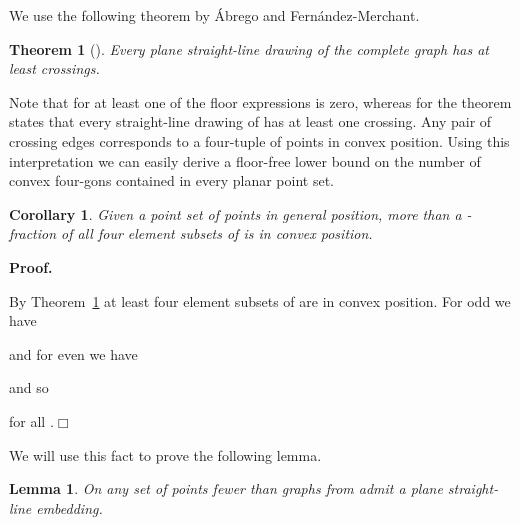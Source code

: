 \documentclass[11pt]{article}
\newtheorem{lemma}[equation]{Lemma}
\newtheorem{corollary}[equation]{Corollary}
\newtheorem{theorem}[equation]{Theorem}
\newcommand{\qed}{\hfill\ensuremath{\Box}}
\newenvironment{proof}{\noindent\textbf{Proof.}
}{\par\medskip}
\begin{document}
\noindent We use the following theorem by \'{A}brego and Fern\'{a}ndez-Merchant.
\begin{theorem}[\cite{AF05}]\label{t:cn}
  Every plane straight-line drawing of the complete graph  has at
  least  crossings.
\end{theorem}
Note that for  at least one of the floor expressions is zero, whereas
for  the theorem states that every straight-line drawing of  has at
least one crossing. Any pair of crossing edges corresponds to a four-tuple of
points in convex position. Using this interpretation we can easily derive a
floor-free lower bound on the number of convex four-gons contained in every
planar point set.
\begin{corollary}\label{cor:convex_4_tuples}
  Given a point set  of  points in general position,
  more than a -fraction of all four
  element subsets of  is in convex position.
\end{corollary}
\begin{proof}
  By Theorem~\ref{t:cn} at least  four element subsets of  are in convex position. For  odd we
  have

and for  even we have

and so

for all .\qed
\end{proof}
We will use this fact to prove the following lemma.
\begin{lemma}\label{lem:tn_on_point_set}
  On any set  of  points fewer than
   graphs from  admit a plane
  straight-line embedding.
\end{lemma}
\end{document}

